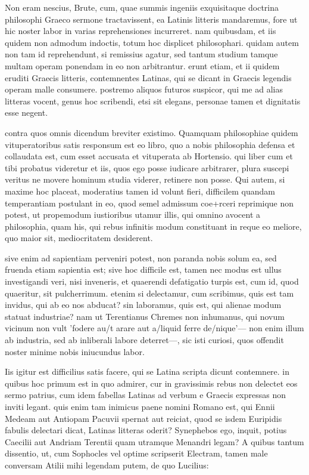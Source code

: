 
 Non eram nescius, Brute, cum, quae summis ingeniis exquisitaque doctrina philosophi Graeco sermone tractavissent, ea Latinis litteris mandaremus, fore ut hic noster labor in varias reprehensiones incurreret. nam quibusdam, et iis quidem non admodum indoctis, totum hoc displicet philosophari. quidam autem non tam id reprehendunt, si remissius agatur, sed tantum studium tamque multam operam ponendam in eo non arbitrantur. erunt etiam, et ii quidem eruditi Graecis litteris, contemnentes Latinas, qui se dicant in Graecis legendis operam malle consumere. postremo aliquos futuros suspicor, qui me ad alias litteras vocent, genus hoc scribendi, etsi sit elegans, personae tamen et dignitatis esse negent.

 contra quos omnis dicendum breviter existimo. Quamquam philosophiae quidem vituperatoribus satis responsum est eo libro, quo a nobis philosophia defensa et collaudata est, cum esset accusata et vituperata ab Hortensio. qui liber cum et tibi probatus videretur et iis, quos ego posse iudicare arbitrarer, plura suscepi veritus ne movere hominum studia viderer, retinere non posse. Qui autem, si maxime hoc placeat, moderatius tamen id volunt fieri, difficilem quandam temperantiam postulant in eo, quod semel admissum coe+rceri reprimique non potest, ut propemodum iustioribus utamur illis, qui omnino avocent a philosophia, quam his, qui rebus infinitis modum constituant in reque eo meliore, quo maior sit, mediocritatem desiderent.

 sive enim ad sapientiam perveniri potest, non paranda nobis solum ea, sed fruenda etiam sapientia est; sive hoc difficile est, tamen nec modus est ullus investigandi veri, nisi inveneris, et quaerendi defatigatio turpis est, cum id, quod quaeritur, sit pulcherrimum. etenim si delectamur, cum scribimus, quis est tam invidus, qui ab eo nos abducat? sin laboramus, quis est, qui alienae modum statuat industriae? nam ut Terentianus Chremes non inhumanus, qui novum vicinum non vult 'fodere au/t arare aut a/liquid ferre de/nique'— non enim illum ab industria, sed ab inliberali labore deterret—, sic isti curiosi, quos offendit noster minime nobis iniucundus labor.

 Iis igitur est difficilius satis facere, qui se Latina scripta dicunt contemnere. in quibus hoc primum est in quo admirer, cur in gravissimis rebus non delectet eos sermo patrius, cum idem fabellas Latinas ad verbum e Graecis expressas non inviti legant. quis enim tam inimicus paene nomini Romano est, qui Ennii Medeam aut Antiopam Pacuvii spernat aut reiciat, quod se isdem Euripidis fabulis delectari dicat, Latinas litteras oderit? Synephebos ego, inquit, potius Caecilii aut Andriam Terentii quam utramque Menandri legam? A quibus tantum dissentio, ut, cum Sophocles vel optime scripserit Electram, tamen male conversam Atilii mihi legendam putem, de quo Lucilius:

